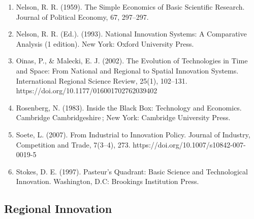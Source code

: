 \documentclass[a4paper,11pt]{article}
\begin{document}
\begin{enumerate}
\item Nelson, R. R. (1959). The Simple Economics of Basic Scientific Research. Journal of Political Economy, 67, 297–297.
\item Nelson, R. R. (Ed.). (1993). National Innovation Systems: A Comparative Analysis (1 edition). New York: Oxford University Press.
\item Oinas, P., \& Malecki, E. J. (2002). The Evolution of Technologies in Time and Space: From National and Regional to Spatial Innovation Systems. International Regional Science Review, 25(1), 102–131. https://doi.org/10.1177/016001702762039402
\item Rosenberg, N. (1983). Inside the Black Box: Technology and Economics. Cambridge Cambridgeshire ; New York: Cambridge University Press.
\item Soete, L. (2007). From Industrial to Innovation Policy. Journal of Industry, Competition and Trade, 7(3–4), 273. https://doi.org/10.1007/s10842-007-0019-5
\item Stokes, D. E. (1997). Pasteur’s Quadrant: Basic Science and Technological Innovation. Washington, D.C: Brookings Institution Press.
\end{enumerate}

\subsection{Regional Innovation}
\end{document}
